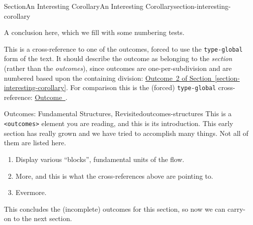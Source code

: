 \documentclass[twoside,10pt,]{article}
\newcommand{\xreffont}{\relax}
\newcommand{\mono}[1]{\texttt{#1}}
\newlength{\fillinmaxwidth}
\newlength{\fillincontract}
\newlength{\charmaxwidth}\setlength{\charmaxwidth}{0.5em}
\newlength{\charminwidth}\setlength{\charminwidth}{0.1em}
\newlength{\fillinheight}
\newcommand{\fillintext}[1]{%
\setlength{\fillinmaxwidth}{#1\charmaxwidth}%
\setlength{\fillincontract}{#1\charminwidth}%
\setlength{\fillinheight}{\baselineskip}\addtolength{\fillinheight}{1.2pt}%
\strut\nobreak\leaders\vbox{\hrule width 0.3pt height 0.3pt \vskip -1.2pt}\hskip 1\fillinmaxwidth minus \fillincontract\nobreak\strut%
}
\numberwithin{equation}{section}
\begin{document}
\begin{sectionptx}{Section}{An Interesting Corollary}{}{An Interesting Corollary}{}{}{section-interesting-corollary}
\begin{conclusion}{}%
A conclusion here, which we fill with some numbering tests.%
\par
This is a cross-reference to one of the outcomes, forced to use the \mono{type-global} form of the text.  It should describe the outcome as belonging to the \emph{section} (rather than the \emph{outcomes}), since outcomes are one-per-subdivision and are numbered based upon the containing division: \hyperlink{outcome-structure}{Outcome~2 of Section~{\xreffont\ref{section-interesting-corollary}}}.  For comparison this is the (forced) \mono{type-global} cross-reference: \hyperlink{outcome-structure}{Outcome~{\xreffont 4.2}}.%
\end{conclusion}%
\begin{outcomes}{Outcomes: Fundamental Structures, Revisited}{outcomes-structures}
This is a \mono{<outcomes>} element you are reading, and this is its introduction.  This early section has really grown and we have tried to accomplish many things.  Not all of them are listed here.%
%
\begin{enumerate}
\item{}Display various ``blocks'', fundamental units of the flow.%
\item\hypertarget{outcome-structure}{}More, and this is what the cross-references above are pointing to.%
\item{}Evermore.%
\end{enumerate}
This concludes the (incomplete) outcomes for this section, so now we can carry-on to the next section.%
\end{outcomes}
\end{sectionptx}
\end{document}
